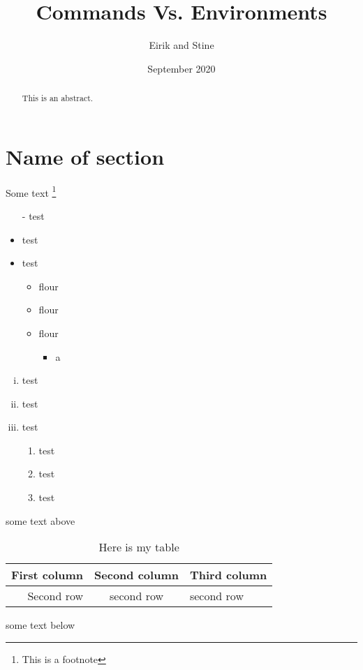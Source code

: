 \documentclass{article}
\title{Commands Vs. Environments}
\author{Eirik and Stine}
\date{September 2020}
\begin{document}
\maketitle

\begin{abstract}
    This is an abstract.
\end{abstract}
\section{Name of section}
Some text \footnote[2]{This is a footnote}

\begin{itemize}
    \item[-] test
    \item test
    \item test
    \begin{itemize}
        \item flour
        \item flour
        \item flour
        \begin{itemize}
            \item a
        \end{itemize}
    \end{itemize}
\end{itemize}

\begin{enumerate}[i.]
    \item test
    \item test
    \item test
    \begin{enumerate}
        \item test
        \item test
        \item test
    \end{enumerate}
\end{enumerate}

some text above

\begin{table}[h]
\centering
\begin{tabular}{|r|c|l|}
\hline
First column & Second column & Third column \\\hline\hline
Second row & second row & second row \\
\end{tabular}
\caption{Here is my table}
\end{table}

some text below
\end{document}

